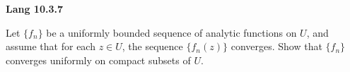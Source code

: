 \textbf{Lang 10.3.7}

Let $\{f_n\}$ be a uniformly bounded sequence of analytic functions on $U$, and assume that for each $z \in U$, the 
sequence $\{f_n(z)\}$ converges. Show that $\{f_n\}$ converges uniformly on compact subsets of $U$.

\begin{solution}
  \ \\
\end{solution}
